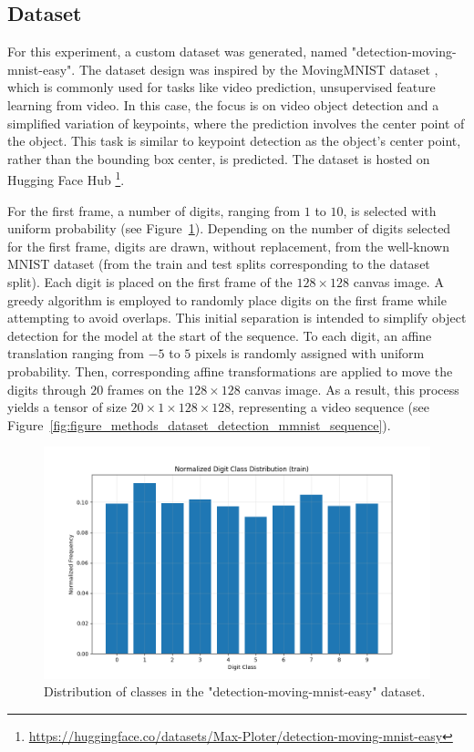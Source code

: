 \subsection{Dataset} \label{Methods:Dataset}

For this experiment, a custom dataset was generated, named "detection-moving-mnist-easy". The dataset design was inspired by the MovingMNIST dataset \cite{srivastava2016unsupervisedlearningvideorepresentations}, which is commonly used for tasks like video prediction, unsupervised feature learning from video. In this case, the focus is on video object detection and a simplified variation of keypoints, where the prediction involves the center point of the object. This task is similar to keypoint detection as the object's center point, rather than the bounding box center, is predicted. The dataset is hosted on Hugging Face Hub \footnote{\url{https://huggingface.co/datasets/Max-Ploter/detection-moving-mnist-easy}}.

For the first frame, a number of digits, ranging from $1$ to $10$, is selected with uniform probability (see Figure~\ref{fig:figure_method_dataset_train_digit_classes}). Depending on the number of digits selected for the first frame, digits are drawn, without replacement, from the well-known MNIST dataset \cite{lecunGradientbasedLearningApplied1998} (from the train and test splits corresponding to the dataset split). Each digit is placed on the first frame of the $128 \times 128$ canvas image. A greedy algorithm is employed to randomly place digits on the first frame while attempting to avoid overlaps. This initial separation is intended to simplify object detection for the model at the start of the sequence. To each digit, an affine translation ranging from $-5$ to $5$ pixels is randomly assigned with uniform probability. Then, corresponding affine transformations are applied to move the digits through $20$ frames on the $128 \times 128$ canvas image. As a result, this process yields a tensor of size $20 \times 1 \times 128 \times 128$, representing a video sequence (see Figure~\ref{fig:figure_methods_dataset_detection_mmnist_sequence}).

\begin{figure}
    \centering
    \includegraphics[width=\textwidth]{figures/figure_method_dataset_train_digit_classes.png}
    \caption{Distribution of classes in the "detection-moving-mnist-easy" dataset.}
    \label{fig:figure_method_dataset_train_digit_classes}
\end{figure}

